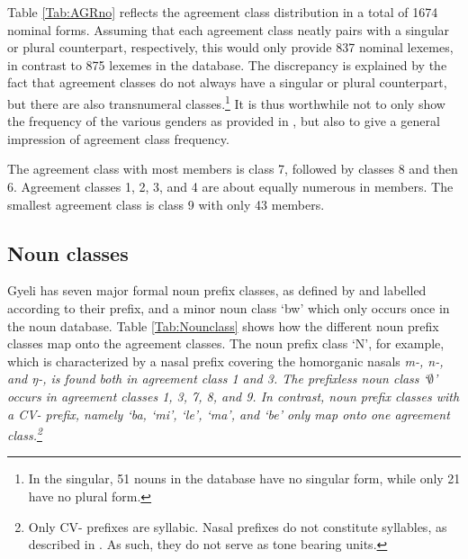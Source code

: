 \noindent Table \ref{Tab:AGRno} reflects the agreement class distribution in a total of 1674 nominal forms. Assuming that each agreement class neatly pairs with a singular or plural counterpart, respectively, this would only provide 837 nominal lexemes, in contrast to 875 lexemes in the database. The discrepancy is explained by the fact that agreement classes do not always have a singular or plural counterpart, but there are also transnumeral classes.\footnote{In the singular, 51 nouns in the database have no singular form, while only 21 have no plural form.}  It is thus worthwhile not to only show the frequency of the various genders as provided in , but also to give a general impression of agreement class frequency.

 The agreement class with most members is class 7, followed by classes 8 and then 6. Agreement classes 1, 2, 3, and 4 are about equally numerous in members. The smallest agreement class is class 9 with only 43 members.  

\subsection{Noun classes}
\label{sec:NC}



Gyeli has seven major formal noun prefix classes, as defined by and labelled according to their prefix, and a minor noun class `bw'  which only occurs once in the noun database. Table \ref{Tab:Nounclass}  shows how the different noun prefix classes map onto the agreement classes. The noun prefix class `N', for example, which is characterized by a nasal prefix covering the homorganic nasals \itshape{m}-, \itshape{n}-, and \itshape{ŋ}-, is found both in agreement class 1 and 3. The prefixless noun class `$\emptyset$' occurs in agreement classes 1, 3, 7, 8, and 9. In contrast, noun prefix classes with a CV- prefix, namely `ba, `mi', `le', `ma', and `be' only map onto one agreement class.\footnote{Only CV- prefixes are syllabic. Nasal prefixes do not constitute syllables, as described in . As such, they do not serve as tone bearing units.}



